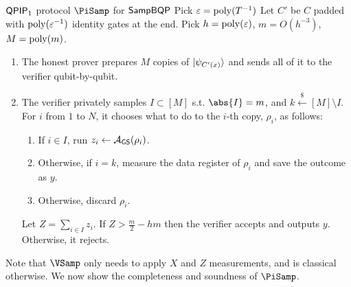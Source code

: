 \begin{protocol}{$\operatorname{\mathsf{QPIP}}_1$ protocol $\PiSamp$ for $\operatorname{\mathsf{SampBQP}}$}\label{ProtoQPIP1}
	Pick $\varepsilon=\operatorname*{\operatorname{poly}}(T^{-1})$
	Let $C'$ be $C$ padded with $\operatorname*{\operatorname{poly}}(\varepsilon^{-1})$ identity gates at the end.
	Pick $h=\operatorname*{\operatorname{poly}}(\varepsilon)$, $m=O(h^{-3})$, $M=\operatorname*{\operatorname{poly}}(m)$.

	\begin{enumerate}
		\item The honest prover prepares $M$ copies of $\ket{\psi_{C'(x)}}$ and sends all of it to the verifier qubit-by-qubit.
		\item The verifier privately samples $I\subset[M]$ s.t. $\abs{I}=m$, and $k\xleftarrow{\$}[M]\setminus I$.
			For $i$ from $1$ to $N$, it chooses what to do to the $i$-th copy, $\rho_i$, as follows:
		\begin{enumerate}
			\item If $i\in I$, run $z_i\leftarrow\mathcal{A}_{\mathsf{GS}}(\rho_i)$.
			\item Otherwise, if $i=k$, measure the data register of $\rho_i$ and save the outcome as $y$.
			\item Otherwise, discard $\rho_i$.
		\end{enumerate}
			Let $Z=\sum_{i\in I} z_i$. If $Z>\frac{m}{2}-hm$ then the verifier accepts and outputs $y$. Otherwise, it rejects.
	\end{enumerate}
\end{protocol}

Note that $\VSamp$ only needs to apply $X$ and $Z$ measurements, and is classical otherwise. We now show the completeness and soundness of $\PiSamp$.


